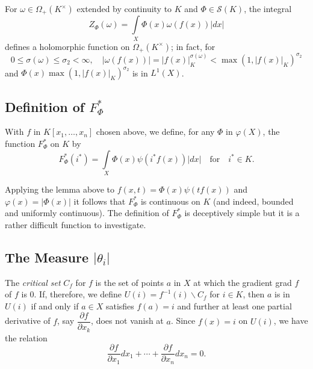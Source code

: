 For $\omega\in \Omega_{+}(K^{\times})$
extended by continuity to $K$ and $\Phi\in\mathscr{S}(K)$, the integral
$$
Z_{\Phi}(\omega)=\int\limits_{X}\Phi(x)\omega(f(x))|dx|
$$
defines a holomorphic function on $\Omega_{+}(K^{\times})$; in fact, for
$$
0\leq \sigma(\omega)\leq \sigma_{2}<\infty,\quad
|\omega(f(x))|=|f(x)|^{\sigma(\omega)}_{K}<\max
(1,|f(x)|_{K})^{\sigma_{2}}
$$
and $\Phi(x)\max (1,|f(x)|_{K})^{\sigma_{2}}$ is in $L^{1}(X)$.

\subsection{Definition of $F^{\ast}_{\Phi}$}\label{chap3:sec1:subsec2} %

With $f$ in
$K[x_{1},\ldots,x_{n}]$ chosen above, we define, for any $\Phi$ in
$\varphi(X)$, the function $F^{\ast}_{\Phi}$ on $K$ by
$$
F^{\ast}_{\Phi}(i^{\ast})=\int\limits_{X}\Phi(x)\psi(i^{\ast}f(x))
|dx|\quad\text{for} \quad i^{\ast}\in K.
$$

Applying the lemma above to $f(x,t)=\Phi(x)\psi(tf(x))$ and
$\varphi(x)=|\Phi(x)|$ it follows that $F^{\ast}_{\Phi}$ is continuous
on $K$ (and indeed, bounded and uniformly continuous). The definition
of $F^{\ast}_{\Phi}$ is deceptively simple but it is a rather
difficult function to investigate.

\subsection{The Measure $|\theta_{i}|$}\label{chap3:sec1:subsec3} %

The {\em critical set} $C_{f}$ for $f$ is the set of points $a$ in $X$
at which the gradient grad $f$ of $f$ is $0$. If, therefore, we define
$U(i)=f^{-1}(i)\backslash C_{f}$ for $i\in K$, then $a$ is in $U(i)$
if and only if $a\in X$ satisfies $f(a)=i$ and further at least one
partial derivative of $f$, say $\dfrac{\partial f}{\partial x_{k}}$,
does not vanish at $a$. Since $f(x)=i$ on $U(i)$, we have the relation
$$
\dfrac{\partial f}{\partial x_{1}}dx_{1}+\cdots+\dfrac{\partial
  f}{\partial x_{n}}dx_{n}=0.
$$


